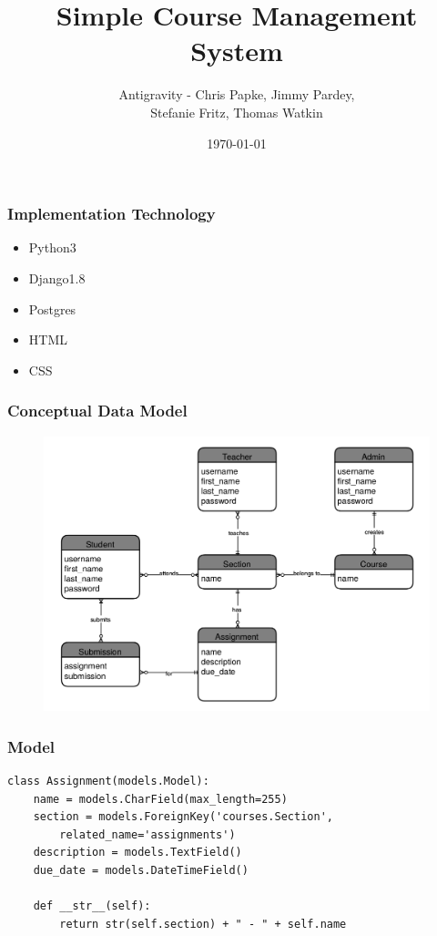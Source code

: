 \documentclass{beamer}
\begin{document}
\title[Group Project]{Simple Course Management System}
\author{Antigravity - Chris Papke, Jimmy Pardey, \\Stefanie Fritz, Thomas Watkin}
\date{\today}

\begin{frame}[plain]
\titlepage
\end{frame}

\begin{frame}[fragile]
\frametitle{Implementation Technology}
\begin{itemize}
	\item Python3
	\item Django1.8
	\item Postgres
	\item HTML
	\item CSS
\end{itemize}
\end{frame}

\begin{frame}[fragile]
\frametitle{Conceptual Data Model}

\begin{figure}
	\includegraphics[width=\textwidth]{concept.png}
\end{figure}
\end{frame}


\begin{frame}[fragile]
\frametitle{Model}

\begin{lstlisting}[basicstyle=\small]
class Assignment(models.Model):
    name = models.CharField(max_length=255)
    section = models.ForeignKey('courses.Section', 
        related_name='assignments')
    description = models.TextField()
    due_date = models.DateTimeField()

    def __str__(self):
        return str(self.section) + " - " + self.name
\end{lstlisting}
\end{frame}
\end{document}
